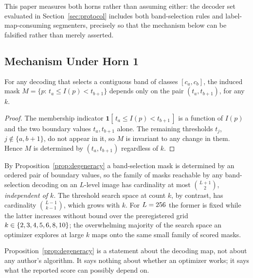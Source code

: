 This paper measures both horns rather than assuming either: the decoder set
evaluated in Section~\ref{sec:protocol} includes both band-selection rules and
label-map-consuming segmenters, precisely so that the mechanism below can be
falsified rather than merely asserted.

\subsection{Mechanism Under Horn 1}

\begin{proposition}
\label{prop:degeneracy}
For any decoding that selects a contiguous band of classes $[c_a,c_b]$, the
induced mask $M=\{p:\,t_a\le I(p)<t_{b+1}\}$ depends only on the pair
$(t_a,t_{b+1})$, for any $k$.
\end{proposition}

\begin{proof}
The membership indicator $\mathbf{1}[\,t_a\le I(p)<t_{b+1}\,]$ is a function of
$I(p)$ and the two boundary values $t_a,t_{b+1}$ alone. The remaining thresholds
$t_j$, $j\notin\{a,b+1\}$, do not appear in it, so $M$ is invariant to any change
in them. Hence $M$ is determined by $(t_a,t_{b+1})$ regardless of $k$.
\end{proof}

\begin{corollary}
\label{cor:cardinality}
By Proposition~\ref{prop:degeneracy} a band-selection mask is determined by an
ordered pair of boundary values, so the family of masks reachable by any
band-selection decoding on an $L$-level image has cardinality at most
$\binom{L+1}{2}$, \emph{independent of $k$}. The threshold search space at count
$k$, by contrast, has cardinality $\binom{L-1}{\,k-1\,}$, which grows with $k$.
For $L=256$ the former is fixed while the latter increases without bound
over the preregistered grid $k \in \{2,3,4,5,6,8,10\}$; the overwhelming majority of the search
space an optimizer explores at large $k$ maps onto the same small family of
scored masks.
\end{corollary}

\begin{remark}
Proposition~\ref{prop:degeneracy} is a statement about the decoding map, not
about any author's algorithm. It says nothing about whether an optimizer works;
it says what the reported score can possibly depend on.
\end{remark}

